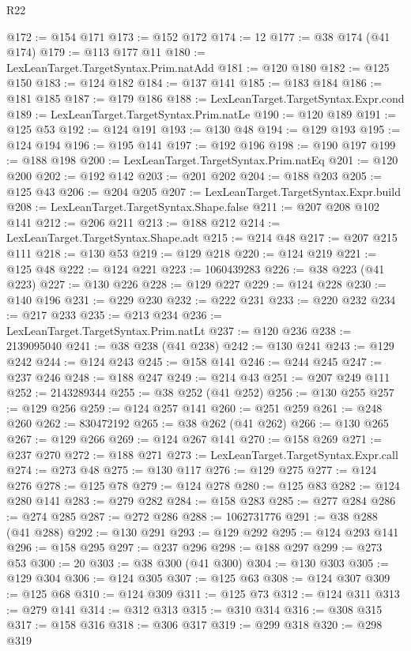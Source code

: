 \begin{lexlean}{R22}
\begin{coremodule}
@172 := @154 @171
@173 := @152 @172
@174 := 12
@177 := @38 @174 (@41 @174)
@179 := @113 @177 @11
@180 := LexLeanTarget.TargetSyntax.Prim.natAdd
@181 := @120 @180
@182 := @125 @150
@183 := @124 @182
@184 := @137 @141
@185 := @183 @184
@186 := @181 @185
@187 := @179 @186
@188 := LexLeanTarget.TargetSyntax.Expr.cond
@189 := LexLeanTarget.TargetSyntax.Prim.natLe
@190 := @120 @189
@191 := @125 @53
@192 := @124 @191
@193 := @130 @48
@194 := @129 @193
@195 := @124 @194
@196 := @195 @141
@197 := @192 @196
@198 := @190 @197
@199 := @188 @198
@200 := LexLeanTarget.TargetSyntax.Prim.natEq
@201 := @120 @200
@202 := @192 @142
@203 := @201 @202
@204 := @188 @203
@205 := @125 @43
@206 := @204 @205
@207 := LexLeanTarget.TargetSyntax.Expr.build
@208 := LexLeanTarget.TargetSyntax.Shape.false
@211 := @207 @208 @102 @141
@212 := @206 @211
@213 := @188 @212
@214 := LexLeanTarget.TargetSyntax.Shape.adt
@215 := @214 @48
@217 := @207 @215 @111
@218 := @130 @53
@219 := @129 @218
@220 := @124 @219
@221 := @125 @48
@222 := @124 @221
@223 := 1060439283
@226 := @38 @223 (@41 @223)
@227 := @130 @226
@228 := @129 @227
@229 := @124 @228
@230 := @140 @196
@231 := @229 @230
@232 := @222 @231
@233 := @220 @232
@234 := @217 @233
@235 := @213 @234
@236 := LexLeanTarget.TargetSyntax.Prim.natLt
@237 := @120 @236
@238 := 2139095040
@241 := @38 @238 (@41 @238)
@242 := @130 @241
@243 := @129 @242
@244 := @124 @243
@245 := @158 @141
@246 := @244 @245
@247 := @237 @246
@248 := @188 @247
@249 := @214 @43
@251 := @207 @249 @111
@252 := 2143289344
@255 := @38 @252 (@41 @252)
@256 := @130 @255
@257 := @129 @256
@259 := @124 @257 @141
@260 := @251 @259
@261 := @248 @260
@262 := 830472192
@265 := @38 @262 (@41 @262)
@266 := @130 @265
@267 := @129 @266
@269 := @124 @267 @141
@270 := @158 @269
@271 := @237 @270
@272 := @188 @271
@273 := LexLeanTarget.TargetSyntax.Expr.call
@274 := @273 @48
@275 := @130 @117
@276 := @129 @275
@277 := @124 @276
@278 := @125 @78
@279 := @124 @278
@280 := @125 @83
@282 := @124 @280 @141
@283 := @279 @282
@284 := @158 @283
@285 := @277 @284
@286 := @274 @285
@287 := @272 @286
@288 := 1062731776
@291 := @38 @288 (@41 @288)
@292 := @130 @291
@293 := @129 @292
@295 := @124 @293 @141
@296 := @158 @295
@297 := @237 @296
@298 := @188 @297
@299 := @273 @53
@300 := 20
@303 := @38 @300 (@41 @300)
@304 := @130 @303
@305 := @129 @304
@306 := @124 @305
@307 := @125 @63
@308 := @124 @307
@309 := @125 @68
@310 := @124 @309
@311 := @125 @73
@312 := @124 @311
@313 := @279 @141
@314 := @312 @313
@315 := @310 @314
@316 := @308 @315
@317 := @158 @316
@318 := @306 @317
@319 := @299 @318
@320 := @298 @319

\end{coremodule}
\end{lexlean}

